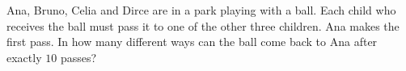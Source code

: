 Ana, Bruno, Celia and Dirce are in a park playing with a ball. Each child who receives the ball must pass it to one of the other three children. Ana makes the first pass. In how many different ways can the ball come back to Ana after exactly $10$ passes?
